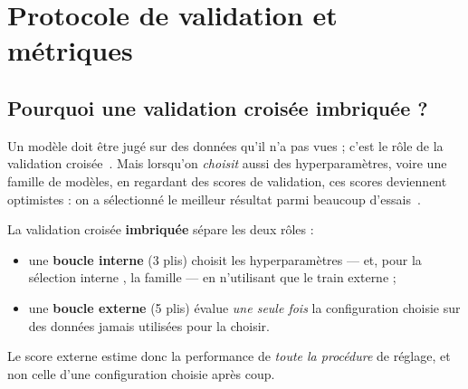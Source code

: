 \clearpage
\section{Protocole de validation et métriques}
\label{sec:protocole}

\subsection{Pourquoi une validation croisée imbriquée ?}

Un modèle doit être jugé sur des données qu'il n'a pas vues ; c'est le rôle de la
validation croisée~\cite{sklearn_cv}. Mais lorsqu'on \emph{choisit} aussi des
hyperparamètres, voire une famille de modèles, en regardant des scores de
validation, ces scores deviennent optimistes : on a sélectionné le meilleur
résultat parmi beaucoup d'essais~\cite{varma_simon_2006,cawley_talbot_2010}.

La validation croisée \textbf{imbriquée} sépare les deux rôles :
\begin{itemize}
  \item une \textbf{boucle interne} (3 plis) choisit les hyperparamètres --- et, pour la \og sélection interne \fg{}, la famille --- en n'utilisant que le train externe ;
  \item une \textbf{boucle externe} (5 plis) évalue \emph{une seule fois} la configuration choisie sur des données jamais utilisées pour la choisir.
\end{itemize}
Le score externe estime donc la performance de \emph{toute la procédure} de
réglage, et non celle d'une configuration choisie après coup.

